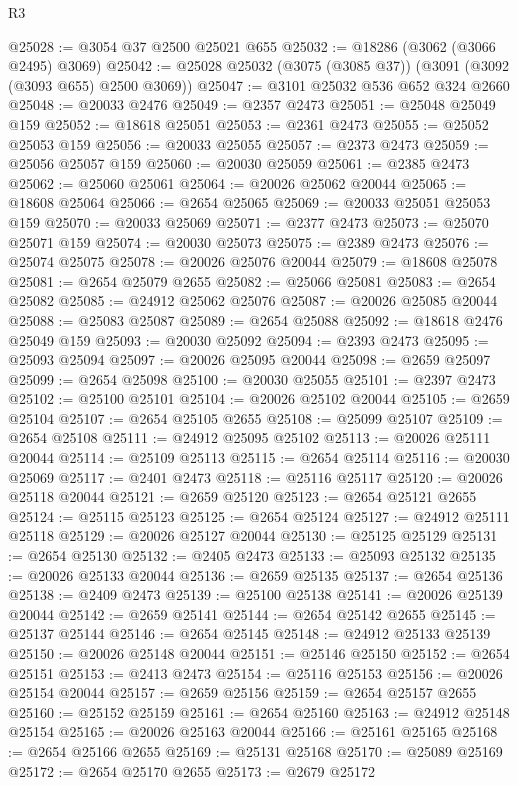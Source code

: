 \begin{lexlean}{R3}
\begin{coremodule}
@25028 := @3054 @37 @2500 @25021 @655
@25032 := @18286 (@3062 (@3066 @2495) @3069)
@25042 := @25028 @25032 (@3075 (@3085 @37)) (@3091 (@3092 (@3093 @655) @2500 @3069))
@25047 := @3101 @25032 @536 @652 @324 @2660
@25048 := @20033 @2476
@25049 := @2357 @2473
@25051 := @25048 @25049 @159
@25052 := @18618 @25051
@25053 := @2361 @2473
@25055 := @25052 @25053 @159
@25056 := @20033 @25055
@25057 := @2373 @2473
@25059 := @25056 @25057 @159
@25060 := @20030 @25059
@25061 := @2385 @2473
@25062 := @25060 @25061
@25064 := @20026 @25062 @20044
@25065 := @18608 @25064
@25066 := @2654 @25065
@25069 := @20033 @25051 @25053 @159
@25070 := @20033 @25069
@25071 := @2377 @2473
@25073 := @25070 @25071 @159
@25074 := @20030 @25073
@25075 := @2389 @2473
@25076 := @25074 @25075
@25078 := @20026 @25076 @20044
@25079 := @18608 @25078
@25081 := @2654 @25079 @2655
@25082 := @25066 @25081
@25083 := @2654 @25082
@25085 := @24912 @25062 @25076
@25087 := @20026 @25085 @20044
@25088 := @25083 @25087
@25089 := @2654 @25088
@25092 := @18618 @2476 @25049 @159
@25093 := @20030 @25092
@25094 := @2393 @2473
@25095 := @25093 @25094
@25097 := @20026 @25095 @20044
@25098 := @2659 @25097
@25099 := @2654 @25098
@25100 := @20030 @25055
@25101 := @2397 @2473
@25102 := @25100 @25101
@25104 := @20026 @25102 @20044
@25105 := @2659 @25104
@25107 := @2654 @25105 @2655
@25108 := @25099 @25107
@25109 := @2654 @25108
@25111 := @24912 @25095 @25102
@25113 := @20026 @25111 @20044
@25114 := @25109 @25113
@25115 := @2654 @25114
@25116 := @20030 @25069
@25117 := @2401 @2473
@25118 := @25116 @25117
@25120 := @20026 @25118 @20044
@25121 := @2659 @25120
@25123 := @2654 @25121 @2655
@25124 := @25115 @25123
@25125 := @2654 @25124
@25127 := @24912 @25111 @25118
@25129 := @20026 @25127 @20044
@25130 := @25125 @25129
@25131 := @2654 @25130
@25132 := @2405 @2473
@25133 := @25093 @25132
@25135 := @20026 @25133 @20044
@25136 := @2659 @25135
@25137 := @2654 @25136
@25138 := @2409 @2473
@25139 := @25100 @25138
@25141 := @20026 @25139 @20044
@25142 := @2659 @25141
@25144 := @2654 @25142 @2655
@25145 := @25137 @25144
@25146 := @2654 @25145
@25148 := @24912 @25133 @25139
@25150 := @20026 @25148 @20044
@25151 := @25146 @25150
@25152 := @2654 @25151
@25153 := @2413 @2473
@25154 := @25116 @25153
@25156 := @20026 @25154 @20044
@25157 := @2659 @25156
@25159 := @2654 @25157 @2655
@25160 := @25152 @25159
@25161 := @2654 @25160
@25163 := @24912 @25148 @25154
@25165 := @20026 @25163 @20044
@25166 := @25161 @25165
@25168 := @2654 @25166 @2655
@25169 := @25131 @25168
@25170 := @25089 @25169
@25172 := @2654 @25170 @2655
@25173 := @2679 @25172

\end{coremodule}
\end{lexlean}
